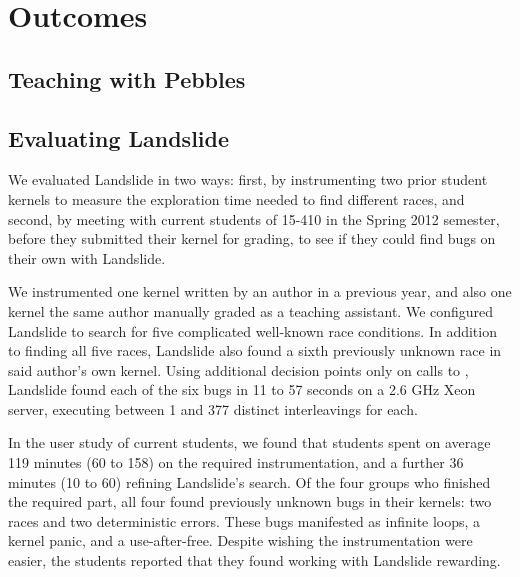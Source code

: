 \section{Outcomes}

\subsection{Teaching with Pebbles}


\subsection{Evaluating Landslide}

We evaluated Landslide in two ways: first, by instrumenting two prior student kernels to measure the exploration time needed to find different races, and second, by meeting with current students of 15-410 in the Spring 2012 semester, before they submitted their kernel for grading, to see if they could find bugs on their own with Landslide.

We instrumented one kernel written by an author in a previous year, and also one kernel the same author manually graded as a teaching assistant.
We configured Landslide to search for five complicated well-known race conditions.
In addition to finding all five races, Landslide also found a sixth previously unknown race in said author's own kernel.
Using additional decision points only on calls to , Landslide found each of the six bugs in 11 to 57 seconds on a 2.6 GHz Xeon server, executing between 1 and 377 distinct interleavings for each.

In the user study of current students, we found that students spent on average 119 minutes (60 to 158) on the required instrumentation, and a further 36 minutes (10 to 60) refining Landslide's search.
Of the four groups who finished the required part, all four found previously unknown bugs in their kernels: two races and two deterministic errors.
These bugs manifested as infinite loops, a kernel panic, and a use-after-free.
Despite wishing the instrumentation were easier, the students reported that they found working with Landslide rewarding.
